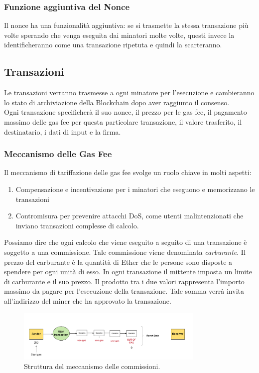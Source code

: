 \documentclass[a4paper,11pt]{report}
\begin{document}
\subsubsection{Funzione aggiuntiva del Nonce}
Il nonce ha una funzionalità aggiuntiva: se si trasmette la stessa transazione più volte sperando che venga eseguita dai minatori molte volte, questi invece la identificheranno come una transazione ripetuta e quindi la scarteranno.

\subsection{Transazioni}
Le transazioni verranno trasmesse a ogni minatore per l'esecuzione e cambieranno lo stato di archiviazione della Blockchain dopo aver raggiunto il consenso. \\
Ogni transazione specificherà il suo nonce, il prezzo per le gas fee, il pagamento massimo delle gas fee per questa particolare transazione, il valore trasferito, il destinatario, i dati di input e la firma.

\subsubsection{Meccanismo delle Gas Fee} 
Il meccanismo di tariffazione delle gas fee svolge un ruolo chiave in molti aspetti: 
\begin{enumerate}
\item  Compensazione e incentivazione per i minatori che eseguono e memorizzano le transazioni
\item  Contromisura per prevenire attacchi DoS, come utenti malintenzionati che inviano transazioni complesse di calcolo.
\end{enumerate}
Possiamo dire che ogni calcolo che viene eseguito a seguito di una transazione è soggetto a una commissione. Tale commissione viene denominata \textit{carburante}.
Il prezzo del carburante è la quantità di Ether che le persone sono disposte a spendere per ogni unità di esso. In ogni transazione il mittente imposta un limite di carburante e il suo prezzo. Il prodotto tra i due valori rappresenta l'importo massimo da pagare per l'esecuzione della transazione. Tale somma verrà invita all'indirizzo del miner che ha approvato la transazione.
\begin{figure}[htbp] 
\begin{center}
\includegraphics[width=9cm]{img/gas.png} 
\end{center}
\caption{Struttura del meccanismo delle commissioni. \cite{genesis}}
\end{figure}
\end{document}
